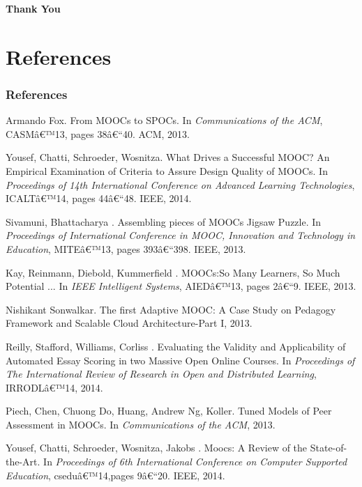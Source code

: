 \documentclass[13pt]{beamer}
\begin{document}
\begin{frame}
	\begin{center}
	      \textbf{Thank You}
	\end{center}

\end{frame}

\section{References}
\begin{frame}[shrink=50]
\frametitle{References}
\begin{thebibliography}{1}
Armando Fox. From MOOCs to SPOCs. In \textit{Communications of the ACM}, CASMâ€™13, pages 38â€“40. ACM, 2013.

Yousef, Chatti, Schroeder, Wosnitza. What Drives a Successful MOOC? An Empirical Examination of Criteria to Assure Design Quality of MOOCs. In \textit{Proceedings of 14th International Conference on Advanced Learning Technologies}, ICALTâ€™14, pages 44â€“48. IEEE, 2014.

 Sivamuni, Bhattacharya . Assembling pieces of MOOCs Jigsaw Puzzle. In \textit{Proceedings of International Conference in MOOC, Innovation and Technology in Education}, MITEâ€™13, pages 393â€“398. IEEE, 2013.

Kay, Reinmann, Diebold, Kummerfield . MOOCs:So Many Learners, So Much Potential ... In \textit{IEEE Intelligent Systems}, AIEDâ€™13, pages 2â€“9. IEEE, 2013.

 Nishikant Sonwalkar. The first Adaptive MOOC: A Case Study on Pedagogy Framework and Scalable Cloud Architecture-Part I, 2013.

Reilly, Stafford, Williams, Corliss . Evaluating the Validity and Applicability of Automated Essay Scoring in two Massive Open Online Courses. In \textit{Proceedings of The International Review of
Research in Open and Distributed Learning}, IRRODLâ€™14, 2014.

 Piech, Chen, Chuong Do, Huang, Andrew Ng, Koller. Tuned Models of Peer Assessment in MOOCs. In \textit{Communications of the ACM}, 2013.

 Yousef, Chatti, Schroeder, Wosnitza, Jakobs . Moocs: A Review of the State-of-the-Art. In \textit{Proceedings of 6th International Conference on Computer Supported Education}, cseduâ€™14,pages 9â€“20. IEEE, 2014.


\end{thebibliography}
\end{frame}
\end{document}
